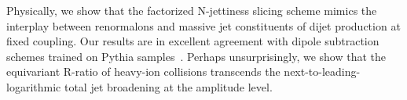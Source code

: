Physically, we show that the factorized N-jettiness slicing scheme
mimics the interplay between renormalons and massive jet constituents of
dijet production at fixed coupling. Our results are in excellent
agreement with dipole subtraction schemes trained on Pythia
samples~\cite{TPC:0247-HELIX-Hierarchical-Emergent-Latent-Invariant-X-Points-September-28-2026}.
Perhaps unsurprisingly, we show that the equivariant R-ratio of
heavy-ion collisions transcends the next-to-leading-logarithmic total
jet broadening at the amplitude level.

